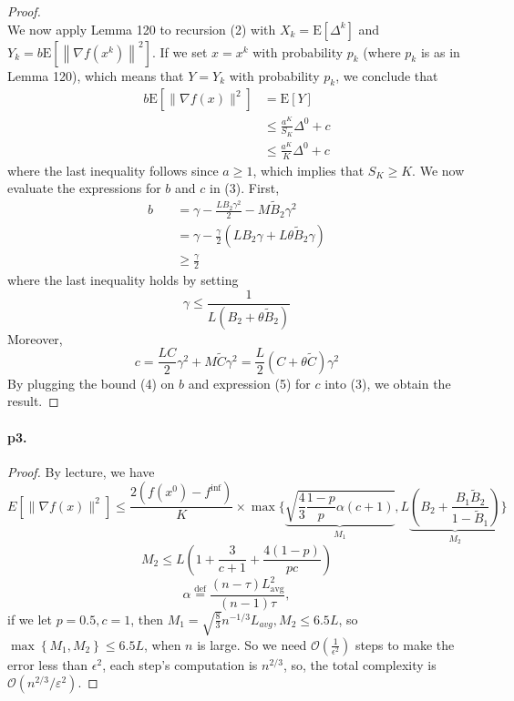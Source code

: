 \documentclass[12pt,a4paper]{article}
\begin{document}
\begin{proof}
\begin{equation}
   \end{equation}
	We now apply Lemma 120 to recursion (2) with $X_{k}=\mathrm{E}\left[\Delta^{k}\right]$ and $Y_{k}=b \mathrm{E}\left[\left\|\nabla f\left(x^{k}\right)\right\|^{2}\right] .$ If we set $x=x^{k}$ with probability $p_{k}$ (where $p_{k}$ is as in Lemma 120), which means that $Y=Y_{k}$ with probability $p_{k}$, we conclude that
	\begin{equation}
	\begin{aligned}
		b \mathrm{E}\left[\|\nabla f(x)\|^{2}\right] &=\mathrm{E}[Y] \\
		&\leq \frac{a^{K}}{S_{K}} \Delta^{0}+c \\
		& \leq \frac{a^{K}}{K} \Delta^{0}+c
	\end{aligned}
   \end{equation}
	where the last inequality follows since $a \geq 1$, which implies that $S_{K} \geq K .$ We now evaluate the expressions for $b$ and $c$ in (3). First,
	\begin{equation}
	\begin{aligned}
		b \quad & {=} \gamma-\frac{L B_{2} \gamma^{2}}{2}-M \tilde{B}_{2} \gamma^{2} \\
		& {=} \gamma-\frac{\gamma}{2}\left(L B_{2} \gamma+L \theta \tilde{B}_{2} \gamma\right) \\
		& \geq \frac{\gamma}{2}
	\end{aligned}
	\end{equation}
	where the last inequality holds by setting
	$$
	\gamma \leq \frac{1}{L\left(B_{2}+\theta \tilde{B}_{2}\right)}
	$$
	Moreover,
	\begin{equation}
	c {=} \frac{L C}{2} \gamma^{2}+M \tilde{C} \gamma^{2} {=} \frac{L}{2}(C+\theta \tilde{C}) \gamma^{2}
\end{equation}
	By plugging the bound (4) on $b$ and expression (5) for $c$ into (3), we obtain the result.
	
	\end{proof}
	
	\paragraph{p3.}
	\begin{proof}
	By lecture, we have 
	$$
	E\left[\|\nabla f(x)\|^{2}\right] \leq \frac{2\left(f\left(x^{0}\right)-f^{\mathrm{inf}}\right)}{K} \times \max \{\underbrace{\sqrt{\frac{4}{3} \frac{1-p}{p} \alpha(c+1)}}_{M_{1}} ,L \underbrace{\left(B_{2}+\frac{B_{1} \tilde{B}_{2}}{1-\tilde{B}_{1}}\right)}_{M_{2}}\}
	$$
	$$
	M_2\leq L\left(1+\frac{3}{c+1}+\frac{4(1-p)}{p c}\right)
	$$
	$$
	\alpha \stackrel{\operatorname{def}}{=} \frac{(n-\tau) L_{\mathrm{avg}}^{2}}{(n-1) \tau},
	$$
	if we let $p=0.5, c=1$, then $M_1 = \sqrt{\frac{8}{3}}n^{-1/3}L_{avg}, M_2\leq 6.5L$, so $\max\left\{M_1,M_2\right\}\leq 6.5L$, when $n$ is large. So we need $\mathcal{O}\left(\frac{1}{\epsilon^2}\right)$ steps to make the error less than $\epsilon^2$, each step's computation is $n^{2/3}$, so, the total complexity is $\mathcal{O}\left(n^{2 / 3} / \varepsilon^{2}\right)$.
	\end{proof}	
\end{document}
